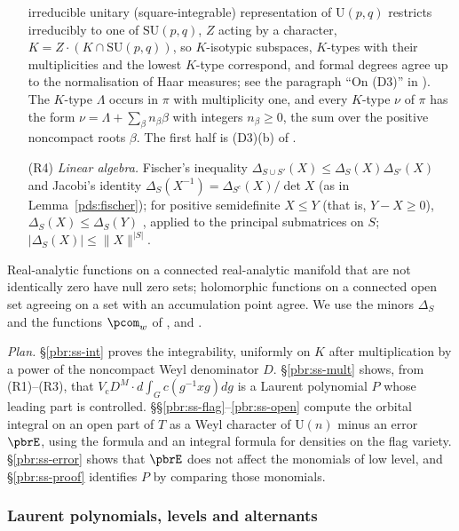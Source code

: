 \documentclass[10pt]{amsart}
\theoremstyle{definition}
\theoremstyle{remark}
\providecommand{\auU}{\mathrm U}
\begin{document}
\begin{enumerate}
irreducible unitary (square-integrable) representation of $\auU(p,q)$ restricts irreducibly to one of
$\mathrm{SU}(p,q)$, $Z$ acting by a character, $K=Z\cdot(K\cap\mathrm{SU}(p,q))$, so $K$-isotypic
subspaces, $K$-types with their multiplicities and the lowest $K$-type correspond, and formal degrees
agree up to the normalisation of Haar measures; see the paragraph ``On (D3)'' in
{\cite[\S3.1.3]{P49}}). The $K$-type $\Lambda$ occurs in $\pi$ with
multiplicity one, and every $K$-type $\nu$ of $\pi$ has the form $\nu=\Lambda+\sum_\beta n_\beta
\beta$ with integers $n_\beta\ge0$, the sum over the positive noncompact roots $\beta$. The first
half is (D3)(b) of {\cite[\S3.1.3]{P49}}.
\item[(R4)] \emph{Linear algebra.} Fischer's inequality $\Delta_{S\cup S'}(X)\le\Delta_S(X)\Delta_{S'}
(X)$ and Jacobi's identity $\Delta_S(X^{-1})=\Delta_{S^c}(X)/\det X$ (as in Lemma~\ref{pds:fischer});
for positive semidefinite $X\le Y$ (that is, $Y-X\ge0$), $\Delta_S(X)\le\Delta_S(Y)$
\cite[Corollary~7.7.4(e)]{HornJohnson}, applied to the principal submatrices on $S$; $|\Delta_S(X)|\le\|X\|^{|S|}$.
\end{enumerate}
Real-analytic functions on a connected real-analytic manifold that are not identically zero have
null zero sets; holomorphic functions on a connected open set agreeing on a set with an
accumulation point agree. We use the minors $\Delta_S$ and the functions $\pcom_w$ of
{\cite[\S3.2.1]{P49}}, and {\cite[Lemma~3.18]{P49}}.

\emph{Plan.} \S\ref{pbr:ss-int} proves the integrability, uniformly on $K$ after multiplication by a
power of the noncompact Weyl denominator $D$. \S\ref{pbr:ss-mult} shows, from (R1)--(R3), that
$V_{\mathrm c}D^{M}\cdot d\int_Gc(g^{-1}xg)dg$ is a Laurent polynomial $P$ whose leading part is
controlled. \S\S\ref{pbr:ss-flag}--\ref{pbr:ss-open} compute the orbital integral on an open part of
$T$ as a Weyl character of $\auU(n)$ minus an error $\pbrE$, using the formula {\cite[(14)]{P49}} and
an integral formula for densities on the flag variety. \S\ref{pbr:ss-error} shows that $\pbrE$ does
not affect the monomials of low level, and \S\ref{pbr:ss-proof} identifies $P$ by comparing those
monomials.

\subsubsection{Laurent polynomials, levels and alternants}\label{pbr:ss-laurent}
\end{document}
